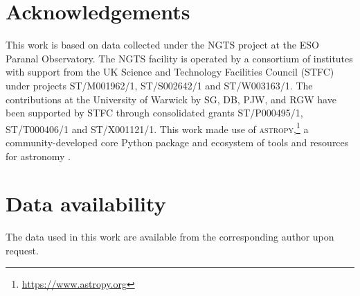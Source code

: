 \documentclass[fleqn,usenatbib]{mnras}
\begin{document}
\section*{Acknowledgements}

This work is based on data collected under the NGTS project at the ESO Paranal Observatory. The NGTS facility is operated by a consortium of institutes with support from the UK Science and Technology Facilities Council (STFC) under projects ST/M001962/1, ST/S002642/1 and ST/W003163/1.
The contributions at the University of Warwick by SG, DB, PJW, and RGW have been supported by STFC through consolidated grants ST/P000495/1, ST/T000406/1 and ST/X001121/1.
This work made use of \textsc{astropy},\footnote{\url{https://www.astropy.org}} a community-developed core Python package and ecosystem of tools and resources for astronomy \citep{astropy:2013, astropy:2018, astropy:2022}.

\section*{Data availability}

The data used in this work are available from the corresponding author upon request.









\bsp	%
\label{lastpage}
\end{document}
